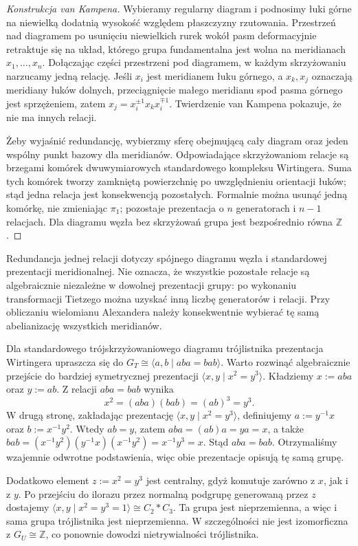 \begin{proof}[Konstrukcja van Kampena]
Wybieramy regularny diagram i podnosimy łuki górne na
niewielką dodatnią wysokość względem płaszczyzny rzutowania.
Przestrzeń nad diagramem po usunięciu niewielkich rurek
wokół pasm deformacyjnie retraktuje się na układ, którego
grupa fundamentalna jest wolna na meridianach $x_1,\dots,x_n$.
Dołączając części przestrzeni pod diagramem, w każdym
skrzyżowaniu narzucamy jedną relację. Jeśli $x_i$ jest
meridianem łuku górnego, a $x_k,x_j$ oznaczają meridiany
łuków dolnych, przeciągnięcie małego meridianu spod pasma
górnego jest sprzężeniem, zatem $x_j=x_i^{\pm1}x_kx_i^{\mp1}$.
Twierdzenie van Kampena pokazuje, że nie ma innych relacji.

Żeby wyjaśnić redundancję, wybierzmy sferę obejmującą
cały diagram oraz jeden wspólny punkt bazowy dla meridianów.
Odpowiadające skrzyżowaniom relacje są brzegami
komórek dwuwymiarowych standardowego kompleksu Wirtingera.
Suma tych komórek tworzy zamkniętą powierzchnię po uwzględnieniu
orientacji łuków; stąd jedna relacja jest konsekwencją
pozostałych. Formalnie można usunąć jedną komórkę, nie
zmieniając $\pi_1$; pozostaje prezentacja o $n$ generatorach
i $n-1$ relacjach. Dla diagramu węzła bez skrzyżowań
grupa jest bezpośrednio równa $\mathbb Z$.
\end{proof}

\begin{uwaga}
Redundancja jednej relacji dotyczy spójnego diagramu węzła
i standardowej prezentacji meridionalnej. Nie oznacza,
że wszystkie pozostałe relacje są algebraicznie niezależne
w dowolnej prezentacji grupy: po wykonaniu transformacji
Tietzego można uzyskać inną liczbę generatorów i relacji.
Przy obliczaniu wielomianu Alexandera należy konsekwentnie
wybierać tę samą abelianizację wszystkich meridianów.
\end{uwaga}

\begin{przyklad}[Trójlistnik]
Dla standardowego trójskrzyżowaniowego diagramu trójlistnika
prezentacja Wirtingera upraszcza się do
$G_T\cong\langle a,b\mid aba=bab\rangle$.
Warto rozwinąć algebraicznie przejście do bardziej symetrycznej
prezentacji
$\langle x,y\mid x^2=y^3\rangle$.
Kładziemy $x:=aba$ oraz $y:=ab$. Z relacji $aba=bab$ wynika
\[
x^2=(aba)(bab)=(ab)^3=y^3.
\]
W drugą stronę, zakładając prezentację $\langle x,y\mid x^2=y^3\rangle$,
definiujemy
$a:=y^{-1}x$ oraz $b:=x^{-1}y^2$. Wtedy $ab=y$, zatem
$aba=(ab)a=ya=x$, a także
$bab=(x^{-1}y^2)(y^{-1}x)(x^{-1}y^2)=x^{-1}y^3=x$.
Stąd $aba=bab$. Otrzymaliśmy wzajemnie odwrotne podstawienia,
więc obie prezentacje opisują tę samą grupę.

Dodatkowo element $z:=x^2=y^3$ jest centralny, gdyż komutuje
zarówno z $x$, jak i z $y$. Po przejściu do ilorazu przez normalną
podgrupę generowaną przez $z$ dostajemy
$\langle x,y\mid x^2=y^3=1\rangle\cong C_2*C_3$.
Ta grupa jest nieprzemienna, a więc i sama grupa trójlistnika
jest nieprzemienna. W szczególności nie jest izomorficzna z
$G_U\cong\mathbb Z$, co ponownie dowodzi nietrywialności
trójlistnika.
\end{przyklad}

